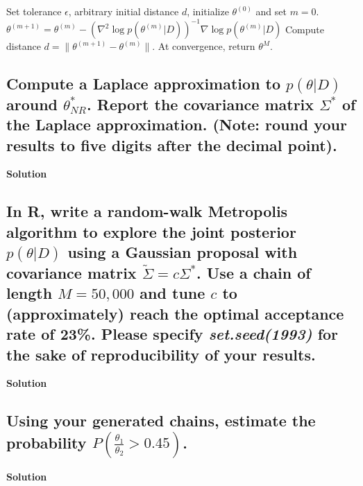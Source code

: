 \documentclass[12pt]{article}
\begin{document}
\begin{algorithm}
\begin{algorithmic}[1]
\State Set tolerance \( \epsilon \), arbitrary initial distance \( d \), initialize \( \theta^{(0)} \) and set \( m = 0 \).
    \State \( \theta^{(m+1)} = \theta^{(m)} - \left( \nabla^2 \log p(\theta^{(m)}|D) \right)^{-1} \nabla \log p(\theta^{(m)}|D) \)
    \State Compute distance \( d = \|\theta^{(m+1)} - \theta^{(m)}\| \).
\EndWhile
\State At convergence, return \( \theta^M \).
\end{algorithmic}
\end{algorithm}

\subsection{Compute a Laplace approximation to \( p(\theta|D) \) around \( \theta^*_{NR} \). Report the covariance matrix \( \Sigma^* \) of the Laplace approximation. (Note: round your results to five digits after the decimal point).}
\textbf{Solution}

\subsection{In R, write a random-walk Metropolis algorithm to explore the joint posterior \( p(\theta|D) \) using a Gaussian proposal with covariance matrix \( \tilde{\Sigma} = c\Sigma^* \). Use a chain of length \( M = 50,000 \) and tune \( c \) to (approximately) reach the optimal acceptance rate of 23\%. Please specify \textit{set.seed(1993)} for the sake of reproducibility of your results.}
\textbf{Solution}

\subsection{Using your generated chains, estimate the probability \( P\left(\frac{\theta_1}{\theta_2} > 0.45\right) \).}
\textbf{Solution}

\printbibliography
\end{document}

